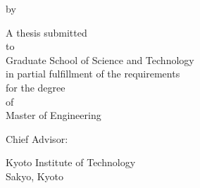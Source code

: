 \begin{titlepage}
{\begin{center}
      \vspace{12truemm * (\NumLinesTitleEN - 1)}
      {\fontsize{16pt}{16pt}\selectfont by}

      \vspace{11truemm}
      {\fontsize{20pt}{20pt}\selectfont {\MyNameEN}}

      \vspace{8.2truemm}
      {\fontsize{15.5pt}{24.1pt}\selectfont
        A thesis submitted\\
        to\\
        Graduate School of Science and Technology\\
        in partial fulfillment of the requirements\\
        for the degree\\
        of\\[2.3truemm]
        Master of Engineering
      }

      \vspace{8.5truemm}
      {\fontsize{17.5pt}{24pt}\selectfont Chief Advisor:~{\ChiefAdvisorEN}\\
      }

      \vspace{11.45truemm}
      {\fontsize{15pt}{15pt}\selectfont Kyoto Institute of Technology\\[2.15truemm]
        Sakyo, Kyoto}

      \vspace{10.5truemm}
      {\fontsize{15pt}{15pt}\selectfont {\DateSubmitted}}

    \end{center}
  }
  \cleartitlepagestyle
\end{titlepage}

\clearpage